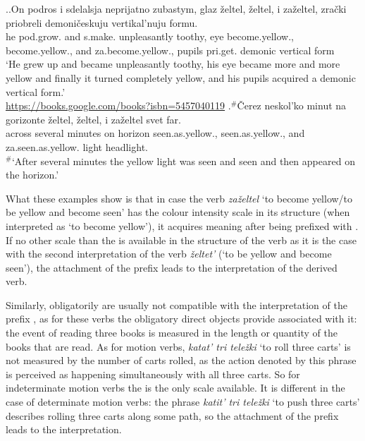 \ex.\label{ex:zazeltet:test}\ag.\label{ex:zazeltet:test1}On podros i sdelalsja neprijatno zubastym, glaz \v{z}eltel, \v{z}eltel, i za\v{z}eltel, zra\v{c}ki priobreli demoni\v{c}eskuju vertikal'nuju formu.\\
he pod.grow. and s.make. unpleasantly toothy, eye become.yellow., become.yellow., and za.become.yellow., pupils pri.get. demonic vertical form\\
\trans `He grew up and became unpleasantly toothy, his eye became more and more yellow and finally it turned completely yellow, and his pupils acquired a demonic vertical form.'\\\hbox{}\hfill\hbox{\url{https://books.google.com/books?isbn=5457040119}}
\bg.$^\#$\v{C}erez neskol'ko minut na gorizonte \v{z}eltel, \v{z}eltel, i za\v{z}eltel svet far.\label{ex:zazeltet:test2}\\
across several minutes on horizon seen.as.yellow., seen.as.yellow., and za.seen.as.yellow. light headlight.\\
\trans $^\#$`After several minutes the yellow light was seen and seen and then appeared on the horizon.'

What these examples show is that in case the verb \textit{za\v{z}eltel} `to become yellow/to be yellow and become seen' has the colour intensity scale in its structure (when interpreted as `to become yellow'), it acquires  meaning after being prefixed with . If no other scale than the  is available in the structure of the verb as it is the case with the second interpretation of the verb \textit{\v{z}eltet'} (`to be yellow and become seen'), the attachment of the prefix  leads to the  interpretation of the derived verb.

Similarly, obligatorily  are usually not compatible with the  interpretation of the prefix , as for these verbs the obligatory direct objects provide  associated with it: the event of reading three books is measured in the  length or quantity of the books that are read. As for motion verbs, \textit{katat' tri tele\v{z}ki} `to roll three carts' is not measured by the number of carts rolled, as the action denoted by this phrase is perceived as happening simultaneously with all three carts. So for indeterminate motion verbs the  is the only scale available. It is different in the case of determinate motion verbs: the phrase \textit{katit' tri tele\v{z}ki} `to push three carts' describes rolling three carts along some path, so the attachment of the prefix  leads to the  interpretation.

